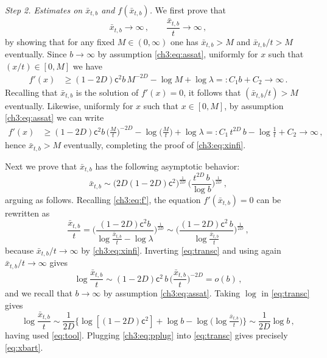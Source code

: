 \documentclass[a4paper,reqno,11pt]{amsart}
\numberwithin{equation}{section}
\newcommand\sfc{\mathsf{c}}
\begin{document}
\medskip
\noindent
\emph{Step 2. Estimates on $\bar x_{t,b}$ and $f(\bar x_{t,b})$.}
We first prove that
\begin{equation} \label{ch3:eq:xinfi}
	\bar x_{t,b} \to \infty \,, \qquad
	\frac{\bar x_{t,b}}{t} \to \infty \,,
\end{equation}
by showing that for any fixed $M \in (0,\infty)$ one has 
$\bar x_{t,b} > M$ and $\bar x_{t,b}/t > M$ eventually.
Since $b\to\infty$ by assumption \eqref{ch3:eq:assat},
uniformly for $x$ such that $(x/t) \in [0,M]$ we have
\begin{equation*}
\begin{split}
	f'(x) & \ge (1-2D) \sfc^2 b \, M^{-2D} 
	- \log M + \log \lambda =: C_1 b + C_2 \to \infty \,.
\end{split}
\end{equation*}
Recalling that $\bar x_{t,b}$ is the solution of $f'(x) = 0$,
it follows that $(\bar x_{t,b} / t) > M$ eventually. Likewise,
uniformly for $x$ such that $x \in [0,M]$, by assumption \eqref{ch3:eq:assat} we can write
\begin{equation*}
\begin{split}
	f'(x) & \ge (1-2D) \sfc^2 b \, \bigg( \frac{M}{t} \bigg)^{-2D} 
	- \log \bigg(\frac{M}{t}\bigg) + \log \lambda 
	=: C_1 \, t^{2D} \, b - \log \frac{1}{t} + C_2 \to \infty \,,
\end{split}
\end{equation*}
hence $\bar x_{t,b} > M$ eventually, completing the proof of \eqref{ch3:eq:xinfi}.

Next we prove that $\bar x_{t,b}$ has the following asymptotic behavior:
\begin{equation} \label{eq:xbart}
	\bar x_{t,b} \sim \big( 2D(1-2D) \sfc^2 \big)^{\frac{1}{2D}} \, \bigg( 
	\frac{t^{2D}\,b}
	{\log b} \bigg)^{\frac{1}{2D}} \,,
\end{equation}
arguing as follows.
Recalling \eqref{ch3:eq:f'}, the equation $f'(\bar x_{t,b}) = 0$ can be rewritten as
\begin{equation} \label{eq:transc}
	\frac{\bar x_{t,b}}{t} 
	= \Bigg( \frac{(1-2D) \sfc^2 b}{\log \frac{\bar x_{t,b}}{t} - \log \lambda} 
	\Bigg)^{\frac{1}{2D}} 
	\sim \Bigg( \frac{(1-2D) \sfc^2 \, b}{\log \frac{\bar x_{t,b}}{t}} \Bigg)^{\frac{1}{2D}} \,,
\end{equation}
because $\bar x_{t,b} / t \to \infty$ by \eqref{ch3:eq:xinfi}.
Inverting \eqref{eq:transc} and using again $\bar x_{t,b} / t \to \infty$ gives
\begin{equation} \label{eq:tool}
	\log \frac{\bar x_{t,b}}{t} \sim
	(1-2D) \sfc^2 \, b \, \bigg( \frac{\bar x_{t,b}}{t} \bigg)^{-2D} = o(b) \,,
\end{equation}
and we recall that $b \to \infty$ by assumption \eqref{ch3:eq:assat}.
Taking $\log$ in \eqref{eq:transc} gives
\begin{equation} \label{ch3:eq:pplug}
	\log \frac{\bar x_{t,b}}{t} \sim \frac{1}{2D} \big\{ \log[(1-2D) \sfc^2] + \log b
	- \log \big( \log \tfrac{\bar x_{t,b}}{t} \big) \big\}
	\sim \frac{1}{2D}  \log b \,,
\end{equation}
having used \eqref{eq:tool}. Plugging \eqref{ch3:eq:pplug}
into \eqref{eq:transc} gives precisely \eqref{eq:xbart}.
\end{document}
